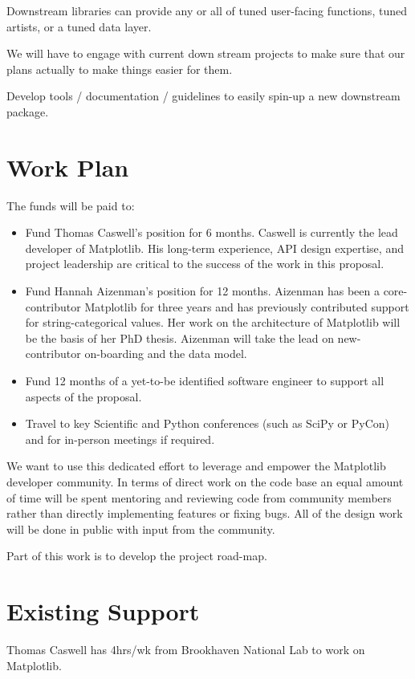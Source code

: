 \documentclass[11pt]{article}  %
\begin{document}
Downstream libraries can provide any or all of tuned user-facing
functions, tuned artists, or a tuned data layer.

We will have to engage with current down stream projects to make sure
that our plans actually to make things easier for them.

Develop tools / documentation / guidelines to easily spin-up a new
downstream package.


\section{Work Plan}

The funds will be paid to:

\begin{itemize}

\item Fund Thomas Caswell's position for 6 months.  Caswell is
  currently the lead developer of Matplotlib.  His long-term
  experience, API design expertise, and project leadership are critical
  to the success of the work in this proposal.
\item Fund Hannah Aizenman's position for 12 months.  Aizenman has
  been a core-contributor Matplotlib for three years and has
  previously contributed support for string-categorical values.  Her
  work on the architecture of Matplotlib will be the basis of her PhD
  thesis.  Aizenman will take the lead on new-contributor on-boarding
  and the data model.
\item Fund 12 months of a yet-to-be identified software engineer to
  support all aspects of the proposal.
\item Travel to key Scientific and Python conferences (such as SciPy
  or PyCon) and for in-person meetings if required.
\end{itemize}

We want to use this dedicated effort to leverage and empower the
Matplotlib developer community.  In terms of direct work on the code
base an equal amount of time will be spent mentoring and reviewing
code from community members rather than directly implementing features
or fixing bugs.  All of the design work will be done in public with
input from the community.

Part of this work is to develop the project road-map.


\section{Existing Support}

Thomas Caswell has 4hrs/wk from Brookhaven National Lab to work on Matplotlib.


\clearpage

\end{document}
